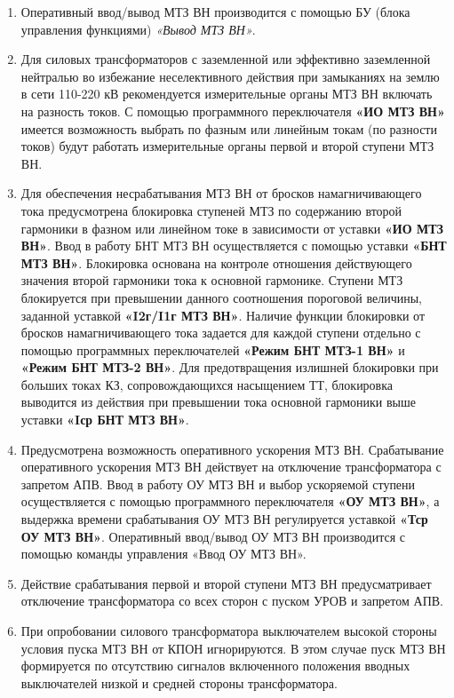 \begin{enumerate}
\item
Оперативный ввод/вывод МТЗ ВН производится с помощью БУ (блока управления функциями) \textit{«Вывод МТЗ ВН»}. 

\item
Для силовых трансформаторов с заземленной или эффективно заземленной нейтралью во избежание неселективного действия при замыканиях на землю в сети 110-220 кВ рекомендуется измерительные органы МТЗ ВН включать на разность токов. С помощью программного переключателя \textbf{«ИО МТЗ ВН»} имеется возможность выбрать по фазным или линейным токам (по разности токов) будут работать измерительные органы первой и второй ступени МТЗ ВН. 

\item
Для обеспечения несрабатывания МТЗ ВН от бросков намагничивающего тока предусмотрена блокировка ступеней МТЗ по содержанию второй гармоники в фазном или линейном токе в зависимости от уставки \textbf{«ИО МТЗ ВН»}. Ввод в работу БНТ МТЗ ВН осуществляется с помощью уставки \textbf{«БНТ МТЗ ВН»}. Блокировка основана на контроле отношения действующего значения второй гармоники тока к основной гармонике. Ступени МТЗ блокируется при превышении данного соотношения пороговой величины, заданной уставкой \textbf{«I2г/I1г МТЗ ВН»}. Наличие функции блокировки от бросков намагничивающего тока задается для каждой ступени отдельно с помощью программных переключателей \textbf{«Режим БНТ МТЗ-1 ВН»} и \textbf{«Режим БНТ МТЗ-2 ВН»}. Для предотвращения излишней блокировки при больших токах КЗ, сопровождающихся насыщением ТТ, блокировка выводится из действия при превышении тока основной гармоники выше уставки \textbf{«Iср БНТ МТЗ ВН»}.

\item
Предусмотрена возможность оперативного ускорения МТЗ ВН. Срабатывание оперативного ускорения МТЗ ВН действует на отключение трансформатора с запретом АПВ. Ввод в работу ОУ МТЗ ВН и выбор ускоряемой ступени осуществляется с помощью программного переключателя \textbf{«ОУ МТЗ ВН»}, а выдержка времени срабатывания ОУ МТЗ ВН регулируется уставкой \textbf{«Тср ОУ МТЗ ВН»}. Оперативный ввод/вывод ОУ МТЗ ВН производится с помощью команды управления «Ввод ОУ МТЗ ВН».

\item
Действие срабатывания первой и второй ступени МТЗ ВН предусматривает отключение трансформатора со всех сторон с пуском УРОВ и запретом АПВ. 

\item
При опробовании силового трансформатора выключателем высокой стороны условия пуска МТЗ ВН от КПОН игнорируются. В этом случае пуск МТЗ ВН формируется по отсутствию сигналов включенного положения вводных выключателей низкой и средней стороны трансформатора.

\end{enumerate} 
